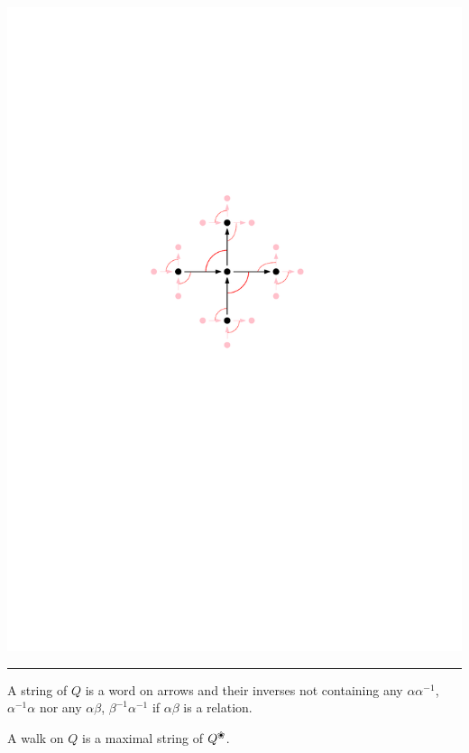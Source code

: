 \documentclass[portrait,final,a0paper,fontscale=0.25]{baposter}
\newcommand{\blossom}{^\text{\ding{96}}} %
\theoremstyle{definition}
\begin{document}
\begin{poster}
{\vspace*{-2.1cm}\hspace*{7.5cm}\includegraphics[scale=.3]{BlossomingQuiverGentle}

\vspace{-.35cm}
\hspace{-.25cm}
{\color{green} \rule{10.02cm}{1pt}}
\vspace{-.4cm}

A {\color{green} string} of $Q$ is a word on arrows and their inverses not containing any $\alpha\alpha^{-1}$, $\alpha^{-1}\alpha$ nor any $\alpha\beta$, $\beta^{-1}\alpha^{-1}$ if $\alpha\beta$ is a relation.

\medskip

A {\color{green} walk} on $Q$ is a maximal string of $Q\blossom$.

}
\end{poster}
\end{document}
